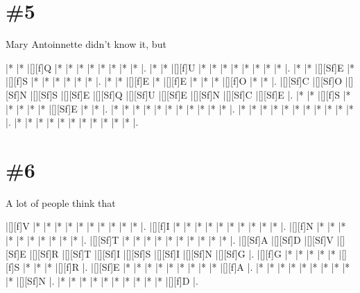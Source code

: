 \documentclass[letterpaper]{article}
\begin{document}
\section*{\#5}
Mary Antoinnette didn't know it, but

\vspace*{1em}
\begin{Puzzle}{11}{9}
|*        |*        |[][f]Q   |*        |*        |*        |*        |*        |*        |*        |*        |. 
|*        |*        |[][f]U   |*        |*        |*        |*        |*        |*        |*        |*        |.  
|*        |*        |[][Sf]E  |*        |[][f]S   |*        |*        |*        |*        |*        |*        |.
|*        |*        |[][f]E   |*        |[][f]E   |*        |*        |*        |[][f]O   |*        |*        |.  
|[][Sf]C  |[][Sf]O  |[][Sf]N  |[][Sf]S  |[][Sf]E  |[][Sf]Q  |[][Sf]U  |[][Sf]E  |[][Sf]N  |[][Sf]C  |[][Sf]E  |.
|*        |*        |[][f]S   |*        |*        |*        |*        |*        |[][Sf]E  |*        |*        |. 
|*        |*        |*        |*        |*        |*        |*        |*        |*        |*        |*        |.
|*        |*        |*        |*        |*        |*        |*        |*        |*        |*        |*        |.
|*        |*        |*        |*        |*        |*        |*        |*        |*        |*        |*        |.
\end{Puzzle}

\section*{\#6}
A lot of people think that

\vspace*{1em}
\begin{Puzzle}{11}{9}
|[][f]V   |*        |*        |*        |*        |*        |*        |*        |*        |*        |*        |. 
|[][f]I   |*        |*        |*        |*        |*        |*        |*        |*        |*        |*        |.  
|[][f]N   |*        |*        |*        |*        |*        |*        |*        |*        |*        |*        |.
|[][Sf]T  |*        |*        |*        |*        |*        |*        |*        |*        |*        |*        |.  
|[][Sf]A  |[][Sf]D  |[][Sf]V  |[][Sf]E  |[][Sf]R  |[][Sf]T  |[][Sf]I  |[][Sf]S  |[][Sf]I  |[][Sf]N  |[][Sf]G  |.
|[][f]G   |*        |*        |*        |*        |*        |[][f]S   |*        |*        |*        |[][f]R   |. 
|[][Sf]E  |*        |*        |*        |*        |*        |*        |*        |*        |*        |[][f]A   |.
|*        |*        |*        |*        |*        |*        |*        |*        |*        |*        |[][Sf]N  |.
|*        |*        |*        |*        |*        |*        |*        |*        |*        |*        |[][f]D   |.
\end{Puzzle}
\end{document}
